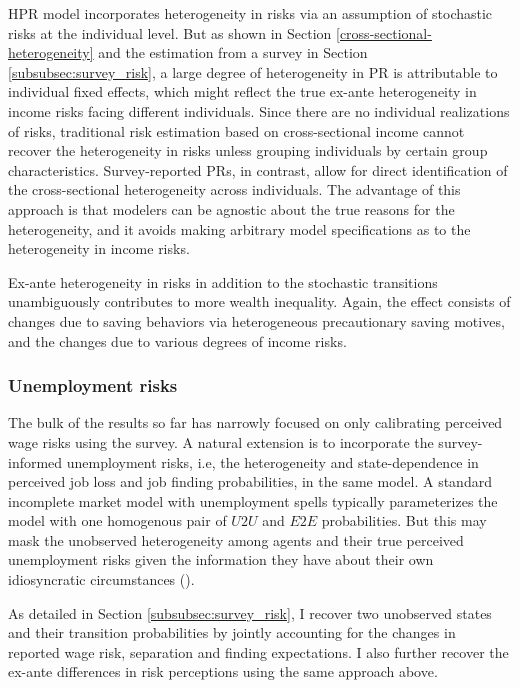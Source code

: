 HPR model incorporates heterogeneity in risks via an assumption of stochastic risks at the individual level. But as shown in Section \ref{cross-sectional-heterogeneity} and the estimation from a survey in Section \ref{subsubsec:survey_risk}, a large degree of heterogeneity in PR is attributable to individual fixed effects, which might reflect the true ex-ante heterogeneity in income risks facing different individuals. Since there are no individual realizations of risks, traditional risk estimation based on cross-sectional income cannot recover the heterogeneity in risks unless grouping individuals by certain group characteristics. Survey-reported PRs, in contrast, allow for direct identification of the cross-sectional heterogeneity across individuals. The advantage of this approach is that modelers can be agnostic about the true reasons for the heterogeneity, and it avoids making arbitrary model specifications as to the heterogeneity in income risks.

Ex-ante heterogeneity in risks in addition to the stochastic transitions unambiguously contributes to more wealth inequality. Again, the effect consists of changes due to saving behaviors via heterogeneous precautionary saving motives, and the changes due to various degrees of income risks. 

\subsubsection{Unemployment risks}

The bulk of the results so far has narrowly focused on only calibrating perceived wage risks using the survey. A natural extension is to incorporate the survey-informed unemployment risks, i.e, the heterogeneity and state-dependence in perceived job loss and job finding probabilities, in the same model. A standard incomplete market model with unemployment spells typically parameterizes the model with one homogenous pair of $U2U$ and $E2E$ probabilities. But this may mask the unobserved heterogeneity among agents and their true perceived unemployment risks given the information they have about their own idiosyncratic circumstances (\cite{mueller2021expectations}).  

As detailed in Section \ref{subsubsec:survey_risk}, I recover two unobserved states and their transition probabilities by jointly accounting for the changes in reported wage risk, separation and finding expectations. I also further recover the ex-ante differences in risk perceptions using the same approach above. 

